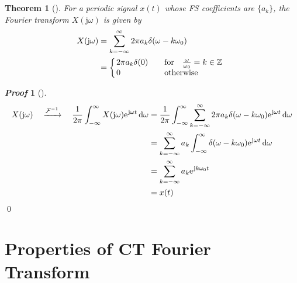 \documentclass[10pt,UTF8]{article}
\makeatletter
\newenvironment{definition box}
{\begin{tcolorbox}[colback=blue!5!white,colframe=blue!75!black,parbox=false,before upper=\par,before lower=\par]}
{\end{tcolorbox}}
\newenvironment{theorem box}
{\begin{tcolorbox}[colback=yellow!5!white,colframe=yellow!75!black,parbox=false,before upper=\par,before lower=\par]}
{\end{tcolorbox}}
\theoremstyle{definition}
\newtheorem{definition inner}{Definition}[section]
\theoremstyle{plain}
\newtheorem{theorem inner}{Theorem}[section]
\newenvironment{theorem}[1][]
{\begin{theorem box}\begin{theorem inner}[#1]\hfill\par}
{\end{theorem inner}\end{theorem box}}
\theoremstyle{definition}
\newtheorem*{proof inner}{\textit{Proof}}
\renewenvironment{proof}[1][]
{\begin{proof inner}[#1]\hfill\par}
{\qed\end{proof inner}}
\theoremstyle{remark}
\newcommand{\mycases}[2][0.8]{
    \left\{\vphantom{\scalebox{#1}{
        $\begin{matrix}#2\end{matrix}$
    }}\right.\!\!\!\!
    \begin{array}{l@{\quad}l}#2\end{array}
}
\newcommand{\ju}{\mathrm{j}}  %
\newcommand{\e}{\mathrm{e}{\mkern 1 mu}}
\makeatother
\begin{document}
\begin{theorem}
    For a periodic signal $x(t)$ whose FS coefficients are $\{a_k\}$,
    the Fourier transform $X(\ju\omega)$ is given by
    \begin{align*}
        X(\ju\omega) &= \sum_{k=-\infty}^{\infty} 
        2\pi a_k \delta(\omega-k\omega_0) \\
        &= \mycases{
            2\pi a_k\delta(0) &\qfor \frac{\omega}{\omega_0}=k\in\mathbb{Z} \\
            0 &\qotherwise
        }
    \end{align*}
\end{theorem}
\begin{proof}
\begin{align*}
    X(\ju\omega) 
    \quad\xrightarrow{\mathcal{F}^{-1}}\quad
    \frac{1}{2\pi}\int_{-\infty}^{\infty}
    X(\ju\omega)\e^{\ju\omega t}\dd{\omega}
    &=  \frac{1}{2\pi}\int_{-\infty}^{\infty}
    \sum_{k=-\infty}^{\infty}
    2\pi a_k \delta(\omega-k\omega_0)
    \e^{\ju\omega t}\dd{\omega} \\
    &= \sum_{k=-\infty}^{\infty}
    a_k \int_{-\infty}^{\infty}
    \delta(\omega-k\omega_0)
    \e^{\ju\omega t}\dd{\omega} \\
    &= \sum_{k=-\infty}^{\infty}
    a_k\e^{\ju k\omega_0 t} \\
    &= x(t)
\end{align*}
\end{proof}

\section{Properties of CT Fourier Transform}
\end{document}
